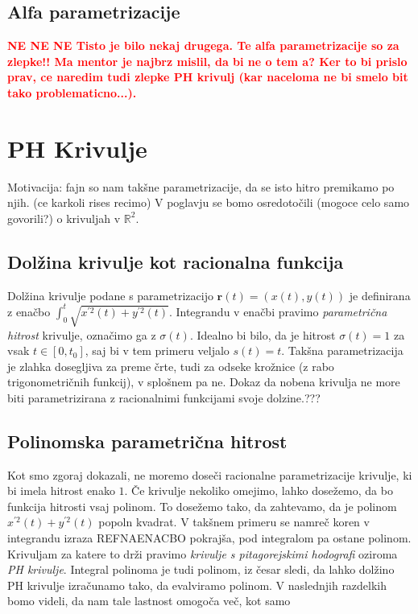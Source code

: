 \documentclass[isrm2, tisk]{fmfdelo}
\newcommand{\R}{\mathbb R}
\newcommand{\mycomment}[1]{\textbf{\textcolor{red}{#1}}}
\begin{document}
    \subsection{Alfa parametrizacije}
    \mycomment{NE
    NE
    NE
    Tisto je bilo nekaj drugega. Te alfa parametrizacije so za zlepke!! Ma mentor je najbrz mislil, da bi ne o tem a?
    Ker to bi prislo prav, ce naredim tudi zlepke PH krivulj (kar naceloma ne bi smelo bit tako problematicno...).
    }


    \section{PH Krivulje}
    Motivacija: fajn so nam takšne parametrizacije, da se isto hitro premikamo po njih. (ce karkoli rises recimo)
    V poglavju se bomo osredotočili (mogoce celo samo govorili?) o krivuljah v $\R^2$.

    \subsection{Dolžina krivulje kot racionalna funkcija}
    Dolžina krivulje podane s parametrizacijo  $\mathbf{r}(t) = \left(x(t),y(t)\right)$ je definirana z enačbo $\int_0^t \sqrt {x^{'2}(t)+y^{'2}(t)}$.
    Integrandu v enačbi pravimo \textit{parametrična hitrost} krivulje, označimo ga z $\sigma(t)$.
    Idealno bi bilo, da je hitrost $\sigma(t) = 1$ za vsak $t\in [0,t_0]$, saj bi v tem primeru veljalo $s(t)=t$.
    Takšna parametrizacija je zlahka dosegljiva za preme črte, tudi za odseke krožnice (z rabo trigonometričnih funkcij), v splošnem pa ne.
    Dokaz da nobena krivulja ne more biti parametrizirana z racionalnimi funkcijami svoje dolzine.???

    \subsection{Polinomska parametrična hitrost}
    Kot smo zgoraj dokazali, ne moremo doseči racionalne parametrizacije krivulje, ki bi imela hitrost enako $1$.
    Če krivulje nekoliko omejimo, lahko dosežemo, da bo funkcija hitrosti vsaj polinom.
    To dosežemo tako, da zahtevamo, da je polinom $x^{'2}(t)+y^{'2}(t)$ popoln kvadrat.
    V takšnem primeru se namreč koren v integrandu izraza REFNAENACBO pokrajša, pod integralom pa ostane polinom.
    Krivuljam za katere to drži pravimo \textit{krivulje s pitagorejskimi hodografi} oziroma \textit{PH krivulje}.
    Integral polinoma je tudi polinom, iz česar sledi, da lahko dolžino PH krivulje izračunamo tako, da evalviramo polinom.
    V naslednjih razdelkih bomo videli, da nam tale lastnost omogoča več, kot samo
\end{document}
